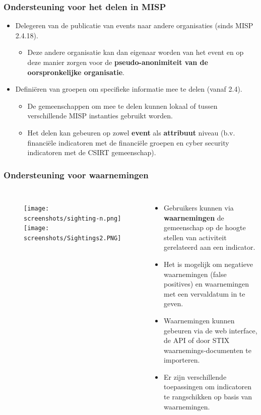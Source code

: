 \begin{frame}
\frametitle{Ondersteuning voor het delen in MISP}
\begin{itemize}
        \item Delegeren van de publicatie van events naar andere organisaties (sinds MISP 2.4.18).
        \begin{itemize}
                \item Deze andere organisatie kan dan eigenaar worden van het event en op deze manier zorgen voor de {\bf pseudo-anonimiteit van de oorspronkelijke organisatie}.
        \end{itemize}
        \item Definiëren van groepen om specifieke informatie mee te delen (vanaf 2.4).
        \begin{itemize}
                \item De gemeenschappen om mee te delen kunnen lokaal of tussen verschillende MISP instanties gebruikt worden.
                \item Het delen kan gebeuren op zowel {\bf event} als {\bf attribuut} niveau (b.v. financiële indicatoren met de financiële groepen en cyber security indicatoren met de CSIRT gemeenschap).
        \end{itemize}
\end{itemize}
\end{frame}

\begin{frame}
        \frametitle{Ondersteuning voor waarnemingen}
        \begin{columns}[t]
        \column{5.0cm}
        \begin{figure}
        \texttt{[image: screenshots/sighting-n.png]}\\
        \texttt{[image: screenshots/Sightings2.PNG]}
        \end{figure}
        \column{7cm}
        \begin{itemize}
                \item Gebruikers kunnen via {\bf waarnemingen} de gemeenschap op de hoogte stellen van activiteit gerelateerd aan een indicator.
                \item Het is mogelijk om negatieve waarnemingen (false positives) en waarnemingen met een vervaldatum in te geven.
                \item Waarnemingen kunnen gebeuren via de web interface, de API of door STIX waarnemings-documenten te importeren.
                \item Er zijn verschillende toepassingen om indicatoren te rangschikken op basis van waarnemingen.
        \end{itemize}
        \end{columns}
\end{frame}



